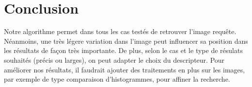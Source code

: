 \documentclass{article}
\begin{document}
\section{Conclusion}

Notre algorithme permet dans tous les cas testés de retrouver l'image requête. Néanmoins, une très légere variation dans l'image peut influencer 
sa position dans les résultats de façon très importante. 
De plus, selon le cas et le type de résulats souhaités (précis ou larges), on peut adapter le choix du descripteur.
Pour améliorer nos résultats, il faudrait ajouter des traitements en plus sur les images, par exemple de type comparaison d'histogrammes, pour affiner la recherche.
\end{document}
